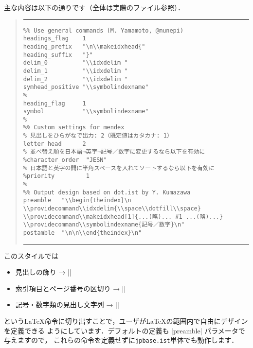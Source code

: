 \documentclass[a4paper]{jsarticle}
\newcommand{\FileName}[1]{\texttt{#1}}
\begin{document}
主な内容は以下の通りです（全体は実際のファイル参照）．
\begin{quote}
\hrule\vskip10pt\noautospacing\noautoxspacing
\begin{verbatim}
%% Use general commands (M. Yamamoto, @munepi)
headings_flag    1
heading_prefix   "\n\\makeidxhead{"
heading_suffix   "}"
delim_0          "\\idxdelim "
delim_1          "\\idxdelim "
delim_2          "\\idxdelim "
symhead_positive "\\symbolindexname"
%
heading_flag     1
symbol           "\\symbolindexname"
%
%% Custom settings for mendex
% 見出しをひらがなで出力: 2（既定値はカタカナ: 1）
letter_head      2
% 並べ替え順を日本語→英字→記号／数字に変更するなら以下を有効に
%character_order  "JESN"
% 日本語と英字の間に半角スペースを入れてソートするなら以下を有効に
%priority         1
%
%% Output design based on dot.ist by Y. Kumazawa
preamble   "\\begin{theindex}\n
\\providecommand\\idxdelim{\\space\\dotfill\\space}
\\providecommand\\makeidxhead[1]{...(略)... #1 ...(略)...}
\\providecommand\\symbolindexname{記号／数字}\n"
postamble  "\n\n\\end{theindex}\n"
\end{verbatim}
\vskip10pt\hrule
\end{quote}

このスタイルでは
\begin{itemize}
 \item 見出しの飾り → |\makeidxhead|
 \item 索引項目とページ番号の区切り → |\idxdelim|
 \item 記号・数字類の見出し文字列 → |\symbolindexname|
\end{itemize}
という\LaTeX 命令に切り出すことで，ユーザが\LaTeX の範囲内で自由にデザインを定義できる
ようにしています．デフォルトの定義も |preamble| パラメータで与えますので，
これらの命令を定義せずに\FileName{jpbase.ist}単体でも動作します．
\end{document}
